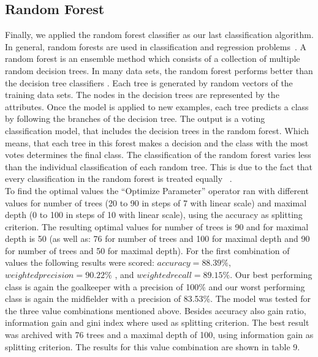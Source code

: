 \subsection{Random Forest}
Finally, we applied the random forest classifier as our last classification algorithm. In general, random forests are used in classification and regression problems~\cite{ref_rapidminerRandomForest}.
A random forest is an ensemble method which consists of a collection of multiple random decision trees. In many data sets, the random forest performs better than the decision tree classifiers \cite{ref_Tan}. 
Each tree is generated by random vectors of the training data sets. The nodes in the decision trees are represented by the attributes. \newline 
Once the model is applied to new examples, each tree predicts a class by following the branches of the decision tree. The output is a voting classification model, that includes the decision trees in the random forest. Which means, that each tree in this forest makes a decision and the class with the most votes determines the final class. The classification of the random forest varies less than the individual classification of each random tree. This is due to the fact that every classification in the random forest is treated equally ~\cite{ref_rapidminerRandomForest}. \\
To find the optimal values the ``Optimize Parameter'' operator ran with different values for number of trees (20 to 90 in steps of 7 with linear scale) and maximal depth (0 to 100 in steps of 10 with linear scale), using the accuracy as splitting criterion. The resulting optimal values for number of trees is 90 and for maximal depth is 50 (as well as: 76 for number of trees and 100 for maximal depth and 90 for number of trees and 50 for maximal depth). 
For the first combination of values the following results were scored: $accuracy = 88.39\%$, $weighted precision = 90.22\%$ , and $weighted recall = 89.15\%$. Our best performing class is again the goalkeeper with a precision of 100\% and our worst performing class is again the midfielder with a precision of 83.53\%. The model was tested for the three
value combinations mentioned above. 
Besides accuracy also gain ratio, information gain and gini index where used as splitting criterion. 
The best result was archived with 76 trees and a maximal depth of 100, using information gain as splitting criterion. 
The results for this value combination are shown in table 9.
